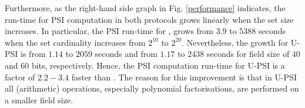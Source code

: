 

 
 
Furthermore, as  the right-hand side graph in Fig. \ref{performance} indicates, the run-time for PSI computation in both protocols grows linearly when  the set size increases.  In particular, the PSI run-time  for \cite{eopsi}, grows from $3.9$ to $5388$ seconds when the set cardinality increases from $2^{\scriptscriptstyle 10}$ to $2^{\scriptscriptstyle 20}$.  Nevertheless, the growth for U-PSI is from $1.14$ to $2059$ seconds and from $1.17$ to $2438$ seconds for field size of $40$ and $60$ bits, respectively. Hence, the PSI computation run-time for U-PSI is a factor of $2.2-3.4$ faster than  \cite{eopsi}. The reason for this improvement is that in U-PSI all (arithmetic) operations, especially polynomial factorisations, are performed on a smaller field size. 

